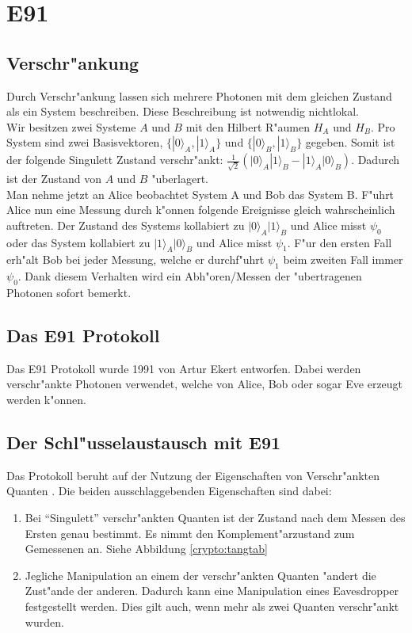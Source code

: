 \newcommand{\qcste}{$-22.5^{\circ}$}
\newcommand{\qcstz}{$0^{\circ}$}
\newcommand{\qcstd}{$22.5^{\circ}$}
\newcommand{\qcstv}{$45^{\circ}$}

\section{E91}
  \subsection{Verschr"ankung}
  Durch Verschr"ankung lassen sich mehrere Photonen mit dem gleichen Zustand als ein System beschreiben. Diese Beschreibung ist notwendig nichtlokal.\\
  	Wir besitzen zwei Systeme $A$ und $B$ mit den Hilbert R"aumen $H_A$ und $H_B$. Pro System sind zwei Basisvektoren,  $ \{|0\rangle_A,|1\rangle_A\}$ und $\{|0\rangle_B,|1\rangle_B\}$ gegeben. Somit ist der folgende Singulett Zustand verschr"ankt: $\frac{1}{\sqrt{2}}(\lvert0\rangle_A|1\rangle_B - |1\rangle_A|0\rangle_B) $. Dadurch ist der Zustand von $A$ und $B$ "uberlagert.\\
	Man nehme jetzt an Alice beobachtet System A und Bob das System B. F"uhrt Alice nun eine Messung durch k"onnen folgende Ereignisse gleich wahrscheinlich auftreten. Der Zustand des Systems kollabiert zu $\lvert0\rangle_A|1\rangle_B$ und Alice misst $\psi_0$ oder das System kollabiert zu $\lvert1\rangle_A|0\rangle_B$ und Alice misst $\psi_1$. F"ur den ersten Fall erh"alt Bob bei jeder Messung, welche er durchf"uhrt $\psi_1$ beim zweiten Fall immer $\psi_0$. Dank diesem Verhalten wird ein Abh"oren/Messen der "ubertragenen Photonen sofort bemerkt.

  \subsection{Das E91 Protokoll}
  Das E91 Protokoll wurde 1991 von Artur Ekert entworfen.
  Dabei werden verschr"ankte Photonen verwendet, welche von Alice, Bob oder sogar Eve erzeugt werden k"onnen.

  \subsection{Der Schl"usselaustausch mit E91}
  Das Protokoll beruht auf der Nutzung der Eigenschaften von Verschr"ankten Quanten \cite{qc:verschraenkung}.
  Die beiden ausschlaggebenden Eigenschaften sind dabei:

  \begin{enumerate}
      \item Bei ``Singulett'' verschr"ankten Quanten ist der Zustand nach dem Messen des Ersten genau bestimmt.
        Es nimmt den Komplement"arzustand zum Gemessenen an.
        Siehe Abbildung \ref{crypto:tangtab}
      \item Jegliche Manipulation an einem der verschr"ankten Quanten "andert die Zust"ande der anderen.
        Dadurch kann eine Manipulation eines Eavesdropper festgestellt werden.
        Dies gilt auch, wenn mehr als zwei Quanten verschr"ankt wurden.
  \end{enumerate}

